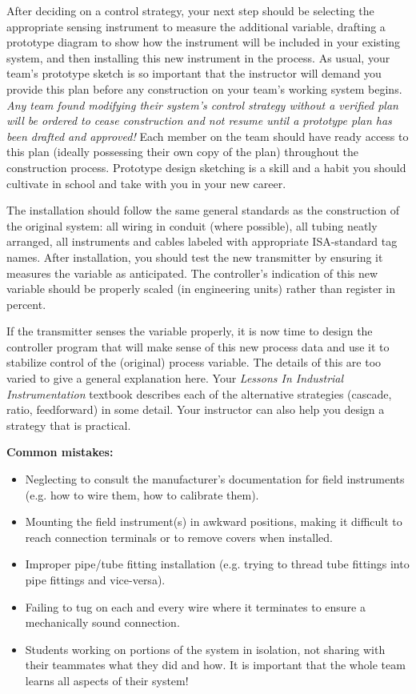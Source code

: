 After deciding on a control strategy, your next step should be selecting the appropriate sensing instrument to measure the additional variable, drafting a prototype diagram to show how the instrument will be included in your existing system, and then installing this new instrument in the process.  As usual, your team's prototype sketch is so important that the instructor will demand you provide this plan before any construction on your team's working system begins.  {\it Any team found modifying their system's control strategy without a verified plan will be ordered to cease construction and not resume until a prototype plan has been drafted and approved!}  Each member on the team should have ready access to this plan (ideally possessing their own copy of the plan) throughout the construction process.  Prototype design sketching is a skill and a habit you should cultivate in school and take with you in your new career.

The installation should follow the same general standards as the construction of the original system: all wiring in conduit (where possible), all tubing neatly arranged, all instruments and cables labeled with appropriate ISA-standard tag names.  After installation, you should test the new transmitter by ensuring it measures the variable as anticipated.  The controller's indication of this new variable should be properly scaled (in engineering units) rather than register in percent.

If the transmitter senses the variable properly, it is now time to design the controller program that will make sense of this new process data and use it to stabilize control of the (original) process variable.  The details of this are too varied to give a general explanation here.  Your {\it Lessons In Industrial Instrumentation} textbook describes each of the alternative strategies (cascade, ratio, feedforward) in some detail.  Your instructor can also help you design a strategy that is practical.

\vskip 10pt

{\bf Common mistakes:}

\begin{itemize}
\item{} Neglecting to consult the manufacturer's documentation for field instruments (e.g. how to wire them, how to calibrate them).
\item{} Mounting the field instrument(s) in awkward positions, making it difficult to reach connection terminals or to remove covers when installed.
\item{} Improper pipe/tube fitting installation (e.g. trying to thread tube fittings into pipe fittings and vice-versa).
\item{} Failing to tug on each and every wire where it terminates to ensure a mechanically sound connection.
\item{} Students working on portions of the system in isolation, not sharing with their teammates what they did and how.  It is important that the whole team learns all aspects of their system!
\end{itemize}






